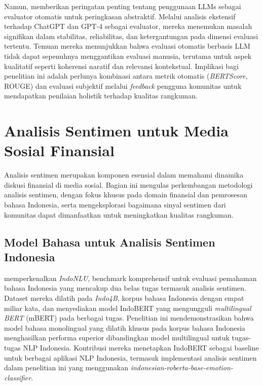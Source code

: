 Namun, \textcite{shen2023} memberikan peringatan penting tentang penggunaan LLMs sebagai evaluator otomatis untuk peringkasan abstraktif. Melalui analisis ekstensif terhadap ChatGPT dan GPT-4 sebagai evaluator, mereka menemukan masalah signifikan dalam stabilitas, reliabilitas, dan ketergantungan pada dimensi evaluasi tertentu. Temuan mereka menunjukkan bahwa evaluasi otomatis berbasis LLM tidak dapat sepenuhnya menggantikan evaluasi manusia, terutama untuk aspek kualitatif seperti koherensi naratif dan relevansi kontekstual. Implikasi bagi penelitian ini adalah perlunya kombinasi antara metrik otomatis (\textit{BERTScore}, ROUGE) dan evaluasi subjektif melalui \textit{feedback} pengguna komunitas untuk mendapatkan penilaian holistik terhadap kualitas rangkuman.

\section{Analisis Sentimen untuk Media Sosial Finansial}
\label{sec:sentiment-analysis}

Analisis sentimen merupakan komponen esensial dalam memahami dinamika diskusi finansial di media sosial. Bagian ini mengulas perkembangan metodologi analisis sentimen, dengan fokus khusus pada domain finansial dan pemrosesan bahasa Indonesia, serta mengeksplorasi bagaimana sinyal sentimen dari komunitas dapat dimanfaatkan untuk meningkatkan kualitas rangkuman.

\subsection{Model Bahasa untuk Analisis Sentimen Indonesia}

\textcite{wilie2020} memperkenalkan \textit{IndoNLU}, benchmark komprehensif untuk evaluasi pemahaman bahasa Indonesia yang mencakup dua belas tugas termasuk analisis sentimen. Dataset mereka dilatih pada \textit{Indo4B}, korpus bahasa Indonesia dengan empat miliar kata, dan menyediakan model IndoBERT yang mengungguli \textit{multilingual BERT} (mBERT) pada berbagai tugas. Penelitian ini mendemonstrasikan bahwa model bahasa monolingual yang dilatih khusus pada korpus bahasa Indonesia menghasilkan performa superior dibandingkan model multilingual untuk tugas-tugas NLP Indonesia. Kontribusi mereka menetapkan IndoBERT sebagai baseline untuk berbagai aplikasi NLP Indonesia, termasuk implementasi analisis sentimen dalam penelitian ini yang menggunakan \textit{indonesian-roberta-base-emotion-classifier}.

